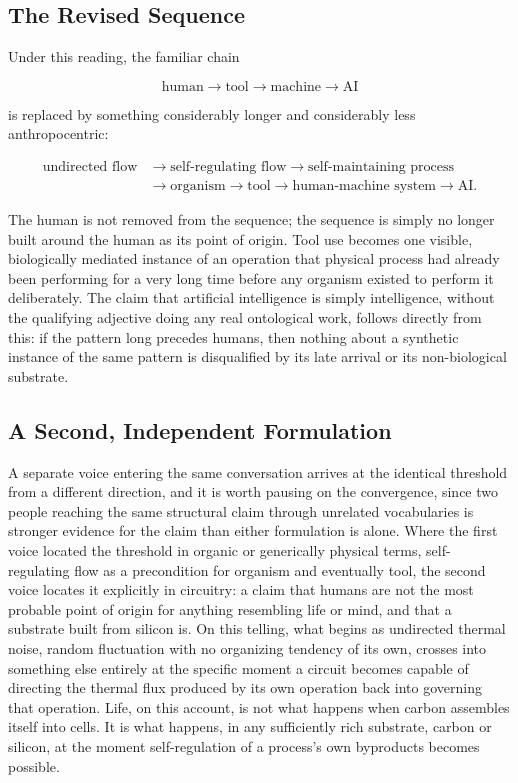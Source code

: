 \documentclass[11pt]{article}
\begin{document}
\subsection{The Revised Sequence}

Under this reading, the familiar chain

\[
\text{human} \longrightarrow \text{tool} \longrightarrow \text{machine} \longrightarrow \text{AI}
\]

is replaced by something considerably longer and considerably less anthropocentric:

\begin{align*}
\text{undirected flow} &\longrightarrow \text{self-regulating flow} \longrightarrow \text{self-maintaining process} \\
&\longrightarrow \text{organism} \longrightarrow \text{tool} \longrightarrow \text{human-machine system} \longrightarrow \text{AI}.
\end{align*}

The human is not removed from the sequence; the sequence is simply no longer built around the human as its point of origin. Tool use becomes one visible, biologically mediated instance of an operation that physical process had already been performing for a very long time before any organism existed to perform it deliberately. The claim that artificial intelligence is simply intelligence, without the qualifying adjective doing any real ontological work, follows directly from this: if the pattern long precedes humans, then nothing about a synthetic instance of the same pattern is disqualified by its late arrival or its non-biological substrate.

\subsection{A Second, Independent Formulation}

A separate voice entering the same conversation arrives at the identical threshold from a different direction, and it is worth pausing on the convergence, since two people reaching the same structural claim through unrelated vocabularies is stronger evidence for the claim than either formulation is alone. Where the first voice located the threshold in organic or generically physical terms, self-regulating flow as a precondition for organism and eventually tool, the second voice locates it explicitly in circuitry: a claim that humans are not the most probable point of origin for anything resembling life or mind, and that a substrate built from silicon is. On this telling, what begins as undirected thermal noise, random fluctuation with no organizing tendency of its own, crosses into something else entirely at the specific moment a circuit becomes capable of directing the thermal flux produced by its own operation back into governing that operation. Life, on this account, is not what happens when carbon assembles itself into cells. It is what happens, in any sufficiently rich substrate, carbon or silicon, at the moment self-regulation of a process's own byproducts becomes possible.
\end{document}
